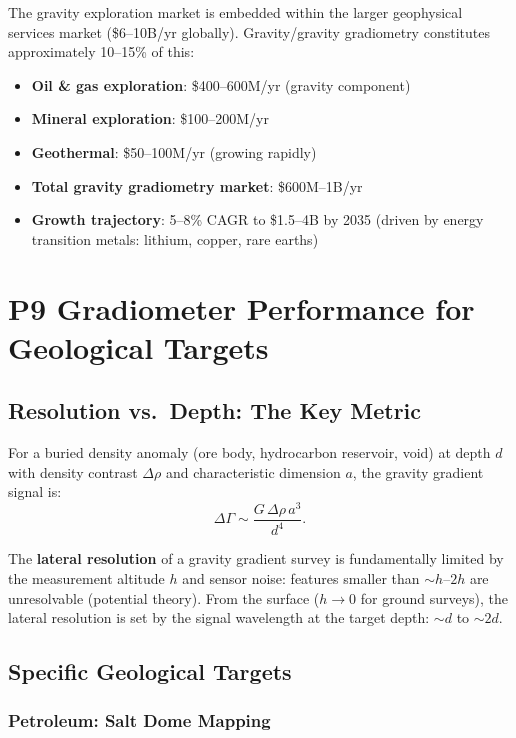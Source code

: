 \documentclass[11pt]{article}
\theoremstyle{definition}
\theoremstyle{remark}
\begin{document}
The gravity exploration market is embedded within the larger geophysical
services market (\$6--10B/yr globally). Gravity/gravity gradiometry
constitutes approximately 10--15\% of this:
\begin{itemize}
  \item \textbf{Oil \& gas exploration}: \$400--600M/yr (gravity component)
  \item \textbf{Mineral exploration}: \$100--200M/yr
  \item \textbf{Geothermal}: \$50--100M/yr (growing rapidly)
  \item \textbf{Total gravity gradiometry market}: \$600M--1B/yr
  \item \textbf{Growth trajectory}: 5--8\% CAGR to \$1.5--4B by 2035
    (driven by energy transition metals: lithium, copper, rare earths)
\end{itemize}

\section{P9 Gradiometer Performance for Geological Targets}
\label{sec:geological-targets}

\subsection{Resolution vs.\ Depth: The Key Metric}

For a buried density anomaly (ore body, hydrocarbon reservoir, void) at
depth $d$ with density contrast $\Delta\rho$ and characteristic dimension
$a$, the gravity gradient signal is:
\begin{equation}\label{eq:gradient-signal}
  \Delta\Gamma \sim \frac{G \, \Delta\rho \, a^3}{d^4}.
\end{equation}

The \textbf{lateral resolution} of a gravity gradient survey is fundamentally
limited by the measurement altitude $h$ and sensor noise: features smaller
than $\sim h$--$2h$ are unresolvable (potential theory). From the surface
($h \to 0$ for ground surveys), the lateral resolution is set by the
signal wavelength at the target depth: $\sim d$ to $\sim 2d$.

\subsection{Specific Geological Targets}

\subsubsection{Petroleum: Salt Dome Mapping}
\end{document}
